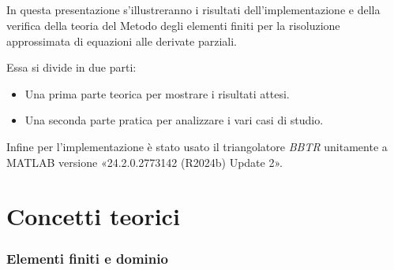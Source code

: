 \documentclass[11pt]{beamer}
\begin{document}
    \begin{frame}\frametitle{\insertsection{}}
         In questa presentazione s'illustreranno i risultati dell'implementazione e della verifica della teoria del Metodo degli elementi finiti per la risoluzione approssimata di equazioni alle derivate parziali.
         
         Essa si divide in due parti:

        \newcommand{\margineS}{1cm}
        \newcommand{\margineD}{0cm}
        \begin{itemize}[label=$\diamond$,
                        itemsep=5pt, %
                        leftmargin=\margineS,%
                        rightmargin=\margineD] %
            \item Una prima parte teorica per mostrare i risultati attesi.
            \item Una seconda parte pratica per analizzare i vari casi di studio.
        \end{itemize}

        Infine per l'implementazione è stato usato il triangolatore \textit{BBTR} unitamente a MATLAB versione «24.2.0.2773142 (R2024b) Update 2». 
    \end{frame}
    

    \part{Concetti teorici}
    \begin{frame}\partpage\end{frame}
    
        \section{Elementi finiti e dominio}
        
\end{document}
